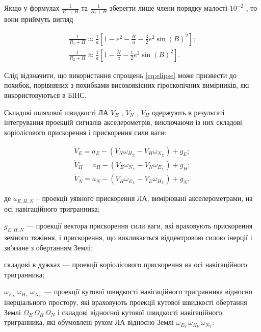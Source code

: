 Якщо у формулах $\frac{1}{R_{1} +H}$ та $\frac{1}{R_{2} +H}$ 
зберегти лише члени порядку малості $10^{-2}$ , то вони приймуть 
вигляд

\begin{equation} 
\label{eq:elips} 
\begin{array}{l} 
{\frac{1}{R_{1} +H} \approx \frac{1}{a}[1-e^{2} -\frac{H}{a} -\frac{3}{2} e^{2} \sin(B)^{2}];} \\ 
{\frac{1}{R_{2} +H} \approx \frac{1}{a}[1-\frac{H}{a} -\frac{1}{2} e^{2} \sin(B)^{2}].} 
\end{array} 
\end{equation} 

Слід відзначити, що використання спрощень \eqref{eq:elipse} може призвести 
до похибок, порівняних з похибками високоякісних гіроскопічних вимірників, які використовуються 
в БІНС.

Складові шляхової швидкості ЛА  $V_E$ , $V_N$ , $V_H$  одержують в результаті інтегрування 
проекцій сигналів акселерометрів, виключаючи із них  складові коріолісового прискорення  і 
прискорення сили ваги: 

\begin{equation} 
\label{eq:Vi} 
 \begin{array}{l} 
{\dot{V}_{E} =a_{E} -(V_{N} \omega_{H_{\Sigma } } -V_{H} \omega_{N_{\Sigma} } )+g_{E} ;} \\ 
{\dot{V}_{H} =a_{H} -(V_{E} \omega_{N_{\Sigma } } -V_{N} \omega_{E_{\Sigma} } )+g_{H} ;} \\ 
{\dot{V}_{N} =a_{N} -(V_{H} \omega_{E_{\Sigma } } -V_{E} \omega_{H_{\Sigma} } )+g_{N} ,} 
\end{array}
\end{equation} 
\begin{ESKDexplanation}
\item де $a_{E,H,N} $ -- проекції уявного прискорення ЛА, вимірювані акселерометрами, 
на осі навігаційного тригранника; 
\item $g_{E,H,N} $ --- проекції вектора прискорення 
сили ваги, які враховують прискорення земного тяжіння, і прискорення, що викликається 
відцентровою силою інерції і зв'язане з обертанням Землі; 
\item складові в дужках --- проекції коріолісового прискорення на осі навігаційного тригранника; 
\item $\omega_{E_{\Sigma}}\, \omega_{H_{\Sigma}}\, \omega_{N_{\Sigma}}$ --- проекції кутової 
швидкості навігаційного тригранника відносно інерціального простору, які враховують 
проекції кутової швидкості обертання Землі $\Omega_{E} \, \Omega_{H} \, \Omega_{N} $ 
і складові відносної кутової швидкості навігаційного тригранника, які обумовлені 
рухом ЛА відносно Землі $\omega_{E_{V} }\, \omega_{H_{V} }\, \omega_{N_{V}} $: 
\end{ESKDexplanation}

